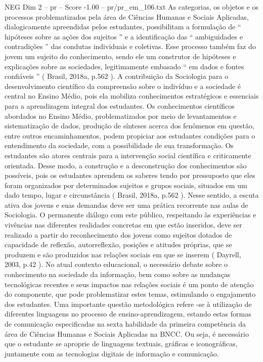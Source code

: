 \begin{textsample}{NEG Dim 2 – pr – Score -1.00 – pr/pr\_em\_106.txt}
As categorias, os objetos e os processos problematizados pela área de Ciências Humanas e Sociais Aplicadas, dialogicamente apreendidas pelos estudantes, possibilitam a formulação de “ hipóteses sobre as ações dos sujeitos ” e a identificação das “ ambiguidades e contradições ” das condutas individuais e coletivas.
Esse processo também faz do jovem um sujeito do conhecimento, sendo ele um construtor de hipóteses e explicações sobre as sociedades, legitimamente embasado “ em dados e fontes confiáveis ” ( Brasil, 2018a, p.562 ).
A contribuição da Sociologia para o desenvolvimento científico da compreensão sobre o indivíduo e a sociedade é central no Ensino Médio, pois ela mobiliza conhecimentos estratégicos e essenciais para a aprendizagem integral dos estudantes.
Os conhecimentos científicos abordados no Ensino Médio, problematizados por meio de levantamentos e sistematização de dados, produção de sínteses acerca dos fenômenos em questão, entre outros encaminhamentos, podem propiciar aos estudantes condições para o entendimento da sociedade, com a possibilidade de sua transformação.
Os estudantes são atores centrais para a intervenção social científica e criticamente orientada.
Desse modo, a construção e a desconstrução dos conhecimentos são possíveis, pois os estudantes aprendem os saberes tendo por pressuposto que eles foram organizados por determinados sujeitos e grupos sociais, situados em um dado tempo, lugar e circunstância ( Brasil, 2018a, p.562 ).
Nesse sentido, a escuta ativa dos jovens e suas demandas deve ser uma prática recorrente nas aulas de Sociologia.
O permanente diálogo com este público, respeitando às experiências e vivências nas diferentes realidades concretas em que estão inseridos, deve ser realizado a partir do reconhecimento dos jovens como sujeitos dotados de capacidade de reflexão, autorreflexão, posições e atitudes próprias, que se produzem e são produzidos nas relações sociais em que se inserem ( Dayrell, 2003, p.42 ).
No atual contexto educacional, o necessário debate sobre o conhecimento na sociedade da informação, bem como sobre as mudanças tecnológicas recentes e seus impactos nas relações sociais é um ponto de atenção do componente, que pode problematizar estes temas, estimulando o engajamento dos estudantes.
Uma importante questão metodológica refere -se à utilização de diferentes linguagens no processo de ensino-aprendizagem, estando estas formas de comunicação especificadas na sexta habilidade da primeira competência da área de Ciências Humanas e Sociais Aplicadas na BNCC.
Ou seja, é necessário que o estudante se aproprie de linguagens textuais, gráficas e iconográficas, juntamente com as tecnologias digitais de informação e comunicação.

\end{textsample}

